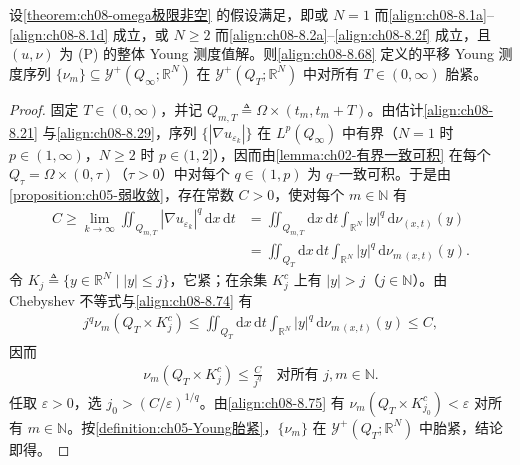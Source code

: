 \documentclass[../../main.tex]{subfiles}%
\begin{document}
\begin{lemma}\label{lemma:ch08-紧性}
设\cref{theorem:ch08-omega极限非空} 的假设满足，即或 $N=1$ 而\eqref{align:ch08-8.1a}--\eqref{align:ch08-8.1d} 成立，或 $N\geqslant2$ 而\eqref{align:ch08-8.2a}--\eqref{align:ch08-8.2f} 成立，且 $(u,\nu)$ 为 (P) 的整体 Young 测度值解。则\eqref{align:ch08-8.68} 定义的平移 Young 测度序列 $\{\nu_m\}\subseteq\mathcal{Y}^+(Q_\infty;\mathbb{R}^N)$ 在 $\mathcal{Y}^+(Q_T;\mathbb{R}^N)$ 中对所有 $T\in(0,\infty)$ 胎紧。
\end{lemma}

\begin{proof}
固定 $T\in(0,\infty)$，并记 $Q_{m,T}\triangleq \Omega\times(t_m,t_m+T)$。由估计\eqref{align:ch08-8.21} 与\eqref{align:ch08-8.29}，序列 $\{|\nabla u_{\varepsilon_k}|\}$ 在 $L^p(Q_\infty)$ 中有界（$N=1$ 时 $p\in(1,\infty)$，$N\geqslant2$ 时 $p\in(1,2]$），因而由\cref{lemma:ch02-有界一致可积} 在每个 $Q_\tau=\Omega\times(0,\tau)$（$\tau>0$）中对每个 $q\in(1,p)$ 为 $q$--一致可积。于是由\cref{proposition:ch05-弱收敛}，存在常数 $C>0$，使对每个 $m\in\mathbb{N}$ 有
\begin{align}
C\geqslant\lim_{k\to\infty}\iint_{Q_{m,T}}|\nabla u_{\varepsilon_k}|^q\,\mathrm{d}x\,\mathrm{d}t
&=\iint_{Q_{m,T}}\mathrm{d}x\,\mathrm{d}t\int_{\mathbb{R}^N}|y|^q\,\mathrm{d}\nu_{(x,t)}(y)\nonumber\\
&=\iint_{Q_T}\mathrm{d}x\,\mathrm{d}t\int_{\mathbb{R}^N}|y|^q\,\mathrm{d}\nu_{m\,(x,t)}(y). \label{align:ch08-8.74}
\end{align}
令 $K_j\triangleq \{y\in\mathbb{R}^N\mid|y|\leqslant j\}$，它紧；在余集 $K_j^c$ 上有 $|y|>j$（$j\in\mathbb{N}$）。由 Chebyshev 不等式与\eqref{align:ch08-8.74} 有
\begin{align*}
j^q\nu_m(Q_T\times K_j^c)\leqslant\iint_{Q_T}\mathrm{d}x\,\mathrm{d}t\int_{\mathbb{R}^N}|y|^q\,\mathrm{d}\nu_{m\,(x,t)}(y)\leqslant C,
\end{align*}
因而
\begin{align}
\nu_m(Q_T\times K_j^c)\leqslant\frac{C}{j^q}\quad\text{对所有 }j,m\in\mathbb{N}. \label{align:ch08-8.75}
\end{align}
任取 $\varepsilon>0$，选 $j_0>(C/\varepsilon)^{1/q}$。由\eqref{align:ch08-8.75} 有 $\nu_m(Q_T\times K_{j_0}^c)<\varepsilon$ 对所有 $m\in\mathbb{N}$。按\cref{definition:ch05-Young胎紧}，$\{\nu_m\}$ 在 $\mathcal{Y}^+(Q_T;\mathbb{R}^N)$ 中胎紧，结论即得。
\end{proof}
\end{document}
